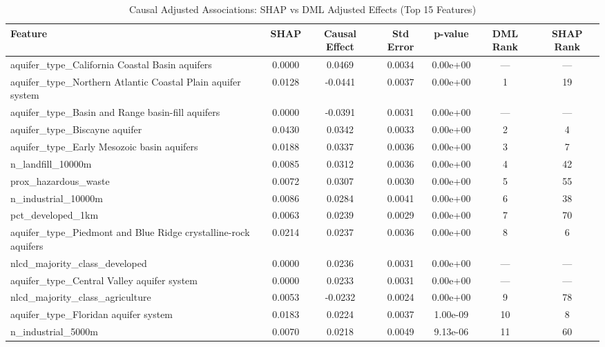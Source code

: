 \begin{table}[ht]
\caption{Causal Adjusted Associations: SHAP vs DML Adjusted Effects (Top 15 Features)}
\centering
\begin{tabular}{lcccccc}
\hline
Feature & SHAP & Causal Effect & Std Error & p-value & DML Rank & SHAP Rank \\
\hline
aquifer_type_California Coastal Basin aquifers & 0.0000 & 0.0469 & 0.0034 & 0.00e+00 & — & — \\
aquifer_type_Northern Atlantic Coastal Plain aquifer system & 0.0128 & -0.0441 & 0.0037 & 0.00e+00 & 1 & 19 \\
aquifer_type_Basin and Range basin-fill aquifers & 0.0000 & -0.0391 & 0.0031 & 0.00e+00 & — & — \\
aquifer_type_Biscayne aquifer & 0.0430 & 0.0342 & 0.0033 & 0.00e+00 & 2 & 4 \\
aquifer_type_Early Mesozoic basin aquifers & 0.0188 & 0.0337 & 0.0036 & 0.00e+00 & 3 & 7 \\
n_landfill_10000m & 0.0085 & 0.0312 & 0.0036 & 0.00e+00 & 4 & 42 \\
prox_hazardous_waste & 0.0072 & 0.0307 & 0.0030 & 0.00e+00 & 5 & 55 \\
n_industrial_10000m & 0.0086 & 0.0284 & 0.0041 & 0.00e+00 & 6 & 38 \\
pct_developed_1km & 0.0063 & 0.0239 & 0.0029 & 0.00e+00 & 7 & 70 \\
aquifer_type_Piedmont and Blue Ridge crystalline-rock aquifers & 0.0214 & 0.0237 & 0.0036 & 0.00e+00 & 8 & 6 \\
nlcd_majority_class_developed & 0.0000 & 0.0236 & 0.0031 & 0.00e+00 & — & — \\
aquifer_type_Central Valley aquifer system & 0.0000 & 0.0233 & 0.0031 & 0.00e+00 & — & — \\
nlcd_majority_class_agriculture & 0.0053 & -0.0232 & 0.0024 & 0.00e+00 & 9 & 78 \\
aquifer_type_Floridan aquifer system & 0.0183 & 0.0224 & 0.0037 & 1.00e-09 & 10 & 8 \\
n_industrial_5000m & 0.0070 & 0.0218 & 0.0049 & 9.13e-06 & 11 & 60 \\
\hline
\end{tabular}
\end{table}
